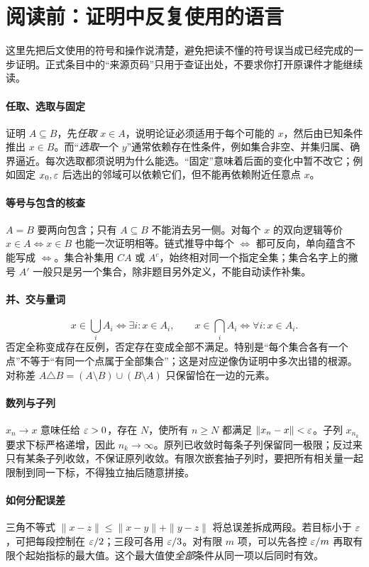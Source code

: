 \clearpage\section*{阅读前：证明中反复使用的语言}
这里先把后文使用的符号和操作说清楚，避免把读不懂的符号误当成已经完成的一步证明。正式条目中的“来源页码”只用于查证出处，不要求你打开原课件才能继续读。

\paragraph{任取、选取与固定}
证明 $A\subseteq B$，先\emph{任取} $x\in A$，说明论证必须适用于每个可能的 $x$，然后由已知条件推出 $x\in B$。而“\emph{选取}一个 $y$”通常依赖存在性条件，例如集合非空、并集归属、确界逼近。每次选取都须说明为什么能选。“固定”意味着后面的变化中暂不改它；例如固定 $x_0,\varepsilon$ 后选出的邻域可以依赖它们，但不能再依赖附近任意点 $x$。

\paragraph{等号与包含的核查}
$A=B$ 要两向包含；只有 $A\subseteq B$ 不能消去另一侧。对每个 $x$ 的双向逻辑等价 $x\in A\iff x\in B$ 也能一次证明相等。链式推导中每个 $\iff$ 都可反向，单向蕴含不能写成 $\iff$。集合补集用 $CA$ 或 $A^c$，始终相对同一个指定全集；集合名字上的撇号 $A'$ 一般只是另一个集合，除非题目另外定义，不能自动读作补集。

\paragraph{并、交与量词}
\[
x\in\bigcup_iA_i\iff\exists i:x\in A_i,
\qquad
x\in\bigcap_iA_i\iff\forall i:x\in A_i.
\]
否定全称变成存在反例，否定存在变成全部不满足。特别是“每个集合各有一个点”不等于“有同一个点属于全部集合”；这是对应逆像伪证明中多次出错的根源。对称差 $A\triangle B=(A\setminus B)\cup(B\setminus A)$ 只保留恰在一边的元素。

\paragraph{数列与子列}
$x_n\to x$ 意味任给 $\varepsilon>0$，存在 $N$，使所有 $n\ge N$ 都满足 $\|x_n-x\|<\varepsilon$。子列 $x_{n_k}$ 要求下标严格递增，因此 $n_k\to\infty$。原列已收敛时每条子列保留同一极限；反过来只有某条子列收敛，不保证原列收敛。有限次嵌套抽子列时，要把所有相关量一起限制到同一下标，不得独立抽后随意拼接。

\paragraph{如何分配误差}
三角不等式 $\|x-z\|\le\|x-y\|+\|y-z\|$ 将总误差拆成两段。若目标小于 $\varepsilon$，可把每段控制在 $\varepsilon/2$；三段可各用 $\varepsilon/3$。对有限 $m$ 项，可以先各控 $\varepsilon/m$ 再取有限个起始指标的最大值。这个最大值使\emph{全部}条件从同一项以后同时有效。

